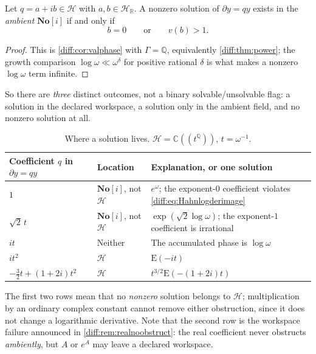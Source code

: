 \documentclass[11pt,letterpaper]{article}
\numberwithin{equation}{section}
\theoremstyle{definition}
\theoremstyle{remark}
\newcommand{\SC}{\mathbf{No}[i]}
\newcommand{\R}{\mathbb R}
\newcommand{\C}{\mathbb C}
\newcommand{\Q}{\mathbb Q}
\newcommand{\der}{\partial}
\newcommand{\Emm}{\mathrm{E}}
\newcommand{\Hring}{\mathscr H}
\begin{document}
\begin{proposition}
\label{diff:prop:Hahnambient}
Let $q=a+ib\in\Hring$ with $a,b\in\Hring_{\R}$. A nonzero solution of
$\der y=qy$ exists in the \emph{ambient} $\SC$ if and only if
\begin{equation}\label{diff:eq:Hahnambient}
 b=0\qquad\text{or}\qquad v(b)>1 .
\end{equation}
\end{proposition}
\begin{proof}
This is \cref{diff:cor:valphase} with $\Gamma=\Q$, equivalently
\cref{diff:thm:power}; the growth comparison $\log\omega\ll\omega^{\delta}$
for positive rational $\delta$ is what makes a nonzero $\log\omega$ term
infinite.
\end{proof}

So there are \emph{three} distinct outcomes, not a binary solvable/unsolvable
flag: a solution in the declared workspace, a solution only in the ambient
field, and no nonzero solution at all.

\begin{table}[htbp]
\centering\small
\caption{Where a solution lives. $\Hring=\C((t^{\Q}))$, $t=\omega^{-1}$.}
\label{diff:tab:workspaceambient}
\begin{tabularx}{\textwidth}{@{}L{0.25\textwidth}L{0.16\textwidth}Y@{}}
\toprule
Coefficient $q$ in $\der y=qy$ & Location & Explanation, or one solution \\
\midrule
$1$ & $\SC$, not $\Hring$ &
$e^{\omega}$; the exponent-$0$ coefficient violates
\cref{diff:eq:Hahnlogderimage} \\
$\sqrt2\,t$ & $\SC$, not $\Hring$ &
$\exp(\sqrt2\log\omega)$; the exponent-$1$ coefficient is irrational \\
$it$ & Neither & The accumulated phase is $\log\omega$ \\
$it^{2}$ & $\Hring$ & $\Emm(-it)$ \\
$-\tfrac32 t+(1+2i)t^{2}$ & $\Hring$ & $t^{3/2}\Emm(-(1+2i)t)$ \\
\bottomrule
\end{tabularx}
\end{table}

The first two rows mean that no \emph{nonzero} solution belongs to $\Hring$;
multiplication by an ordinary complex constant cannot remove either
obstruction, since it does not change a logarithmic derivative. Note that the
second row is the workspace failure announced in
\cref{diff:rem:realnoobstruct}: the real coefficient never obstructs
\emph{ambiently}, but $A$ or $e^{A}$ may leave a declared workspace.
\end{document}
